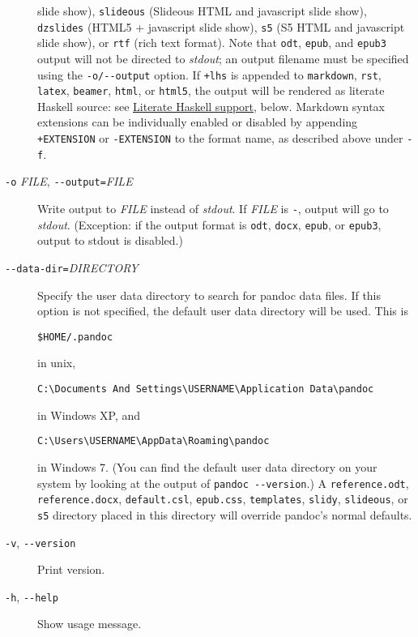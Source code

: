 \documentclass[]{article}
\begin{document}
\begin{description}
slide show), \texttt{slideous} (Slideous HTML and javascript slide
show), \texttt{dzslides} (HTML5 + javascript slide show), \texttt{s5}
(S5 HTML and javascript slide show), or \texttt{rtf} (rich text format).
Note that \texttt{odt}, \texttt{epub}, and \texttt{epub3} output will
not be directed to \emph{stdout}; an output filename must be specified
using the \texttt{-o/-{}-output} option. If \texttt{+lhs} is appended to
\texttt{markdown}, \texttt{rst}, \texttt{latex}, \texttt{beamer},
\texttt{html}, or \texttt{html5}, the output will be rendered as
literate Haskell source: see
\hyperref[literate-haskell-support]{Literate Haskell support}, below.
Markdown syntax extensions can be individually enabled or disabled by
appending \texttt{+EXTENSION} or \texttt{-EXTENSION} to the format name,
as described above under \texttt{-f}.
\item[\texttt{-o} \emph{FILE}, \texttt{-{}-output=}\emph{FILE}]
Write output to \emph{FILE} instead of \emph{stdout}. If \emph{FILE} is
\texttt{-}, output will go to \emph{stdout}. (Exception: if the output
format is \texttt{odt}, \texttt{docx}, \texttt{epub}, or \texttt{epub3},
output to stdout is disabled.)
\item[\texttt{-{}-data-dir=}\emph{DIRECTORY}]
Specify the user data directory to search for pandoc data files. If this
option is not specified, the default user data directory will be used.
This is

\begin{verbatim}
$HOME/.pandoc
\end{verbatim}

in unix,

\begin{verbatim}
C:\Documents And Settings\USERNAME\Application Data\pandoc
\end{verbatim}

in Windows XP, and

\begin{verbatim}
C:\Users\USERNAME\AppData\Roaming\pandoc
\end{verbatim}

in Windows 7. (You can find the default user data directory on your
system by looking at the output of \texttt{pandoc -{}-version}.) A
\texttt{reference.odt}, \texttt{reference.docx}, \texttt{default.csl},
\texttt{epub.css}, \texttt{templates}, \texttt{slidy},
\texttt{slideous}, or \texttt{s5} directory placed in this directory
will override pandoc's normal defaults.
\item[\texttt{-v}, \texttt{-{}-version}]
Print version.
\item[\texttt{-h}, \texttt{-{}-help}]
Show usage message.
\end{description}
\end{document}
